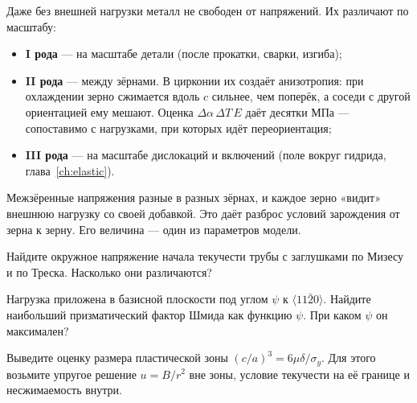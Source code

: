 Даже без внешней нагрузки металл не свободен от напряжений. Их различают по масштабу:
\begin{itemize}
\item \textbf{I рода} --- на масштабе детали (после прокатки, сварки, изгиба);
\item \textbf{II рода} --- между зёрнами. В цирконии их создаёт анизотропия: при охлаждении зерно сжимается вдоль
  $c$ сильнее, чем поперёк, а соседи с другой ориентацией ему мешают. Оценка $\Delta\alpha\,\Delta T\,E$ даёт
  десятки МПа --- сопоставимо с нагрузками, при которых идёт переориентация;
\item \textbf{III рода} --- на масштабе дислокаций и включений (поле вокруг гидрида, глава~\ref{ch:elastic}).
\end{itemize}

\begin{zrbox}
Межзёренные напряжения разные в разных зёрнах, и каждое зерно «видит» внешнюю нагрузку со своей добавкой. Это
даёт разброс условий зарождения от зерна к зерну. Его величина --- один из параметров модели.
\end{zrbox}

\begin{exercise}
Найдите окружное напряжение начала текучести трубы с заглушками по Мизесу и по Треска. Насколько они различаются?
\end{exercise}

\begin{exercise}
Нагрузка приложена в базисной плоскости под углом $\psi$ к $\langle11\bar20\rangle$. Найдите наибольший призматический
фактор Шмида как функцию $\psi$. При каком $\psi$ он максимален?
\end{exercise}

\begin{exercise}
Выведите оценку размера пластической зоны $(c/a)^3 = 6\mu\delta/\sigma_y$. Для этого возьмите упругое решение
$u = B/r^2$ вне зоны, условие текучести на её границе и несжимаемость внутри.
\end{exercise}
